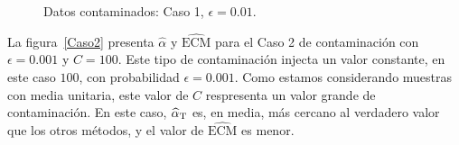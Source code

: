 \begin{figure}[h!]
	\caption{\label{Caso1}\small Datos contaminados: Caso 1, $\epsilon=0.01$.}
\end{figure}


La figura~\ref{Caso2} presenta $\widehat{\alpha}$ y $\widehat{\text{ECM}}$ para el Caso 2 de contaminación con $\epsilon=0.001$ y $C=100$. Este tipo de contaminación injecta un valor constante, en este caso $100$, con probabilidad $\epsilon=0.001$. Como estamos considerando muestras con media unitaria, este valor de $C$ respresenta un valor grande de contaminación. En este caso, $\widehat\alpha_{\text T}$ es, en media, más cercano al verdadero valor que los otros métodos, y el valor de $\widehat{\text{ECM}}$ es menor.

